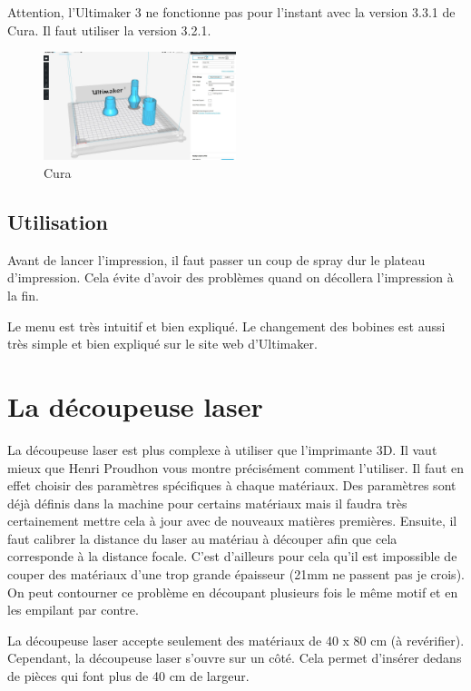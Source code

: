 \documentclass[a4paper, 11pt]{report}
\begin{document}
Attention, l'Ultimaker 3 ne fonctionne pas pour l'instant avec la version 3.3.1 de Cura. Il faut utiliser la version 3.2.1.

\begin{figure}[h!]
	\begin{center}
		\includegraphics[width=0.5\textwidth]{images/cura.jpg}
		\caption{Cura}
	\end{center}
\end{figure}

\subsection{Utilisation}
Avant de lancer l'impression, il faut passer un coup de spray dur le plateau d'impression. Cela évite d'avoir des problèmes quand on décollera l'impression à la fin.

Le menu est très intuitif et bien expliqué. Le changement des bobines est aussi très simple et bien expliqué sur le site web d'Ultimaker.

\section{La découpeuse laser}
La découpeuse laser est plus complexe à utiliser que l'imprimante 3D. Il vaut mieux que Henri Proudhon vous montre précisément comment l'utiliser. Il faut en effet choisir des paramètres spécifiques à chaque matériaux. Des paramètres sont déjà définis dans la machine pour certains matériaux mais il faudra très certainement mettre cela à jour avec de nouveaux matières premières. Ensuite, il faut calibrer la distance du laser au matériau à découper afin que cela corresponde à la distance focale. C'est d'ailleurs pour cela qu'il est impossible de couper des matériaux d'une trop grande épaisseur (21mm ne passent pas je crois). On peut contourner ce problème en découpant plusieurs fois le même motif et en les empilant par contre.

La découpeuse laser accepte seulement des matériaux de 40 x 80 cm (à revérifier). Cependant, la découpeuse laser s'ouvre sur un côté. Cela permet d'insérer dedans de pièces qui font plus de 40 cm de largeur.
\end{document}
